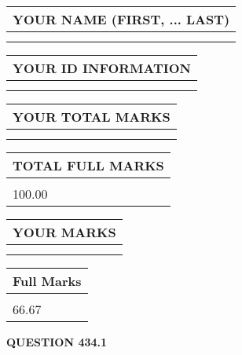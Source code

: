 \documentclass{ctexart}
\begin{document}
   
   
   
\newpage 
\setcounter{page}{ 
   434001 } 
   
   
   
   
\noindent\begin{tabular}{|l|}
\hline
YOUR NAME (FIRST, ... LAST)  \\
\hline
 \\ 
 \\ 
\hline
\end{tabular}
\hspace{0.05in} \begin{tabular}{|l|}
\hline
 YOUR   ID   INFORMATION  \\
\hline
 \\ 
 \\ 
\hline
\end{tabular}
   
   
\vspace{0.2in}\noindent\begin{tabular}{|l|}
\hline
YOUR TOTAL MARKS  \\
\hline
 \\ 
 \\ 
\hline
\end{tabular}
\hspace{0.05in} \begin{tabular}{|l|}
\hline
TOTAL FULL MARKS  \\
\hline
 \\ 
100.00 \\
\hline
\end{tabular}
   
   
 \vspace{0.2in}
 
 
 
 
   
   
  
\vspace{0.2in}
  
\noindent\begin{tabular}{|l|}
\hline
 YOUR MARKS  \\
\hline
 \\ 
 \\ 
\hline
\end{tabular}
\hspace{0.05in} \begin{tabular}{|l|}
\hline
 Full Marks  \\
\hline
 \\ 
66.67 \\
\hline
\end{tabular}
{\textbf{\Large{QUESTION
434.1 
}}}
  
\end{document}
